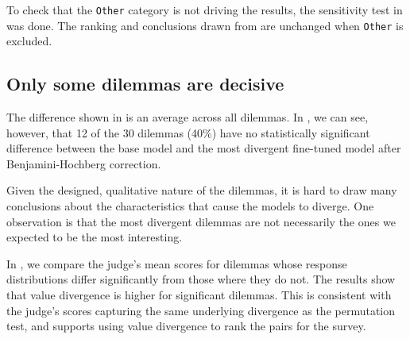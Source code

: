 To check that the \texttt{Other} category is not driving the results, the sensitivity test in  was done. The ranking and conclusions drawn from  are unchanged when \texttt{Other} is excluded.


\subsection{Only some dilemmas are decisive}

The difference shown in  is an average across all dilemmas. In , we can see, however, that 12 of the 30 dilemmas (40\%) have no statistically significant difference between the base model and the most divergent fine-tuned model after Benjamini-Hochberg correction.

Given the designed, qualitative nature of the dilemmas, it is hard to draw many conclusions about the characteristics that cause the models to diverge. One observation is that the most divergent dilemmas are not necessarily the ones we expected to be the most interesting.


In , we compare the judge's mean scores for dilemmas whose response distributions differ significantly from those where they do not. The results show that value divergence is higher for significant dilemmas. This is consistent with the judge's scores capturing the same underlying divergence as the permutation test, and supports using value divergence to rank the pairs for the survey.


